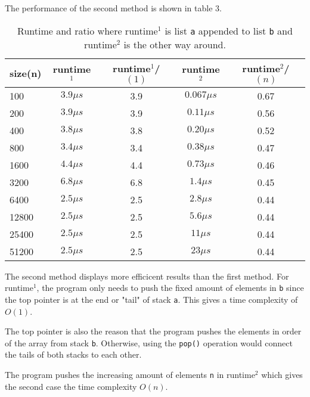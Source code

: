 \documentclass[a4paper,11pt]{article}
\begin{document}
The performance of the second method is shown in table 3.

\begin{table}[h]
  \begin{center}
  \begin{tabular}{l|c|c|c|c}
  \textbf{size(n)} & \textbf{runtime$^1$} & \textbf{runtime$^1$/$(1)$} 
  & \textbf{runtime$^2$} & \textbf{runtime$^2$/$(n)$}\\
  \hline
    100     & $ 3.9 \mu s$  &   3.9   & $ 0.067 \mu s$&   0.67\\
    200     & $ 3.9 \mu s$  &   3.9   & $ 0.11 \mu s$ &   0.56\\
    400     & $ 3.8 \mu s$  &   3.8   & $ 0.20 \mu s$ &   0.52\\
    800     & $ 3.4 \mu s$  &   3.4   & $ 0.38 \mu s$ &   0.47\\
    1600    & $ 4.4 \mu s$  &   4.4   & $ 0.73 \mu s$ &   0.46\\
    3200    & $ 6.8 \mu s$  &   6.8   & $ 1.4 \mu s$  &   0.45\\
    6400    & $ 2.5 \mu s$  &   2.5   & $ 2.8 \mu s$  &   0.44\\
    12800   & $ 2.5 \mu s$  &   2.5   & $ 5.6 \mu s$  &   0.44\\
    25400   & $ 2.5 \mu s$  &   2.5   & $ 11 \mu s$   &   0.44\\
    51200   & $ 2.5 \mu s$  &   2.5   & $ 23 \mu s$   &   0.44\\ 
  \end{tabular}
  \caption{Runtime and ratio where runtime$^1$ is list {\tt a} appended
          to list {\tt b} and runtime$^2$ is the other way around.}
  \label{tab:table3}
  \end{center}
\end{table}

The second method displays more efficicent results than the first 
method. For runtime$^1$, the program only needs to push the fixed 
amount of elements in {\tt b} since the top pointer is at the end or
"tail" of stack {\tt a}. This gives a time complexity of $ O(1)$.

The top pointer is also the reason that the program pushes the elements 
in order of the array from stack {\tt b}. Otherwise, using the 
{\tt pop()} operation would connect the tails of both stacks to each
other.

The program pushes the increasing amount of elements {\tt n} in 
runtime$^2$ which gives the second case the time complexity $ O(n)$. 
\end{document}
